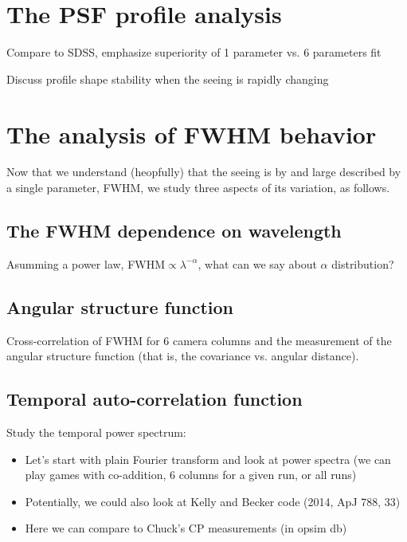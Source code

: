 \documentclass[12pt,preprint]{aastex}
\begin{document}
\section{The PSF profile analysis}

Compare to SDSS, emphasize superiority of 1 parameter vs. 6 parameters fit

Discuss profile shape stability when the seeing is rapidly  changing 


\section{The analysis of FWHM behavior} 

Now that we understand (heopfully) that the seeing is by and large described by 
a single parameter, FWHM, we study three aspects of its variation, as follows.


\subsection{The FWHM dependence on wavelength} 

Asumming a power law, FWHM$\propto \lambda^{-\alpha}$, what can we say 
about $\alpha$ distribution? 


\subsection{Angular structure function} 

Cross-correlation of FWHM for 6 camera columns and the measurement of the angular
structure function (that is, the covariance vs. angular distance). 


\subsection{Temporal auto-correlation function}

Study the temporal power spectrum:
\begin{itemize}
\item Let's start with plain Fourier transform and look at power spectra (we can 
    play games with co-addition, 6 columns for a given run, or all runs)
\item Potentially, we could also look at  Kelly and Becker code  (2014, ApJ 788, 33) 
\item Here we can compare to Chuck's CP measurements (in opsim db) 
\end{itemize} 
\end{document}
